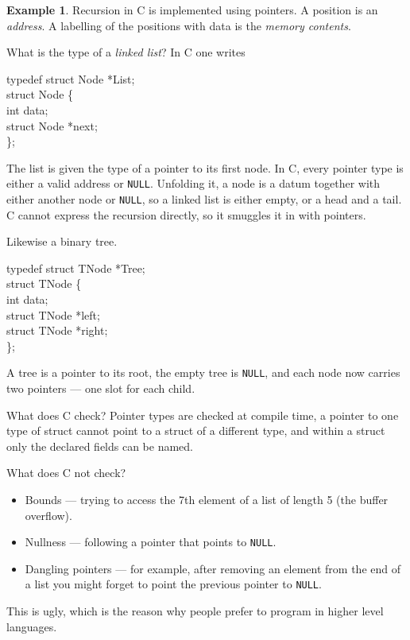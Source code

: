 \documentclass[11pt, a4paper]{article}
\theoremstyle{definition}
\newtheorem{example}[definition]{Example}
\theoremstyle{plain}
\begin{document}
\begin{example}\label{rem:c-pointers}
Recursion in C is
implemented using pointers.
A position is an \emph{address}.  A labelling of the positions with
data is the \emph{memory contents}.

What is the type of a \emph{linked list}?  In C one writes
\begin{center}
\colorbox{gray!15}{\begin{minipage}{0.75\linewidth}
\ttfamily
typedef struct Node *List;\\[4pt]
struct Node \{\\
\hspace*{1.5em}int data;\\
\hspace*{1.5em}struct Node *next;\\
\};
\end{minipage}}
\end{center}
The list is given the type of a pointer to its first node.
In C, every pointer type is either a
valid address or \texttt{NULL}.  Unfolding it, a node is a
datum together with either another node or \texttt{NULL}, so a
linked list is either empty, or a head and a tail.  C cannot express the recursion directly, so it
smuggles it in with pointers.

Likewise a binary tree.
\begin{center}
\colorbox{gray!15}{\begin{minipage}{0.75\linewidth}
\ttfamily
typedef struct TNode *Tree;\\[4pt]
struct TNode \{\\
\hspace*{1.5em}int data;\\
\hspace*{1.5em}struct TNode *left;\\
\hspace*{1.5em}struct TNode *right;\\
\};
\end{minipage}}
\end{center}
A tree is a pointer to its root, the empty tree is \texttt{NULL},
and each node now carries two pointers --- one slot for each
child.

What does C check?  Pointer types are checked at compile time, a
pointer to one type of struct cannot point to a struct of a
different type, and within a struct only the declared fields can
be named.

What does C not check?
\begin{itemize}
\item Bounds --- trying to access the 7th element of a list of
  length 5 (the buffer overflow).
\item Nullness --- following a pointer that points to
  \texttt{NULL}.
\item Dangling pointers --- for example, after removing
  an element from the end of a list you might forget to point the
  previous pointer to \texttt{NULL}.
\end{itemize}

This is ugly, which is the reason why people prefer to
program in higher level languages.
\end{example}
\end{document}
